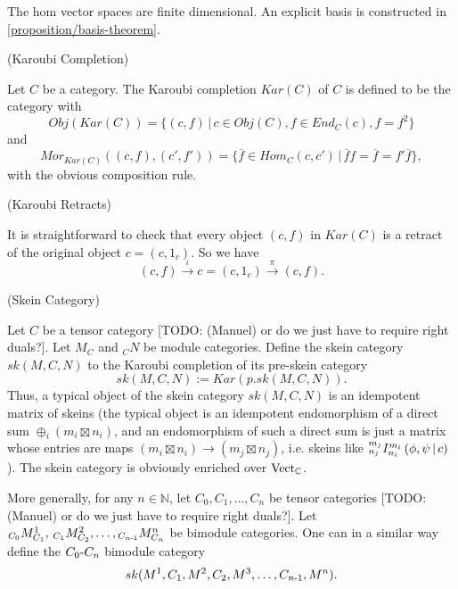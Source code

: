 \noindent The hom vector spaces are finite dimensional. An explicit basis is
constructed in \ref{proposition/basis-theorem}.

\begin{definition} \label{definition/karoubi-completion} (Karoubi Completion)

  \noindent Let $C$ be a category. \quad The Karoubi completion $Kar(C)$ of
  $C$ is defined to be the category with
  \[
    Obj(Kar(C)) = \{(c, f) \,|\, c \in Obj(C), f \in End_{C}(c), f = f^{2}\}
  \] and
  \[
    Mor_{Kar(C)}((c,f), (c', f')) = \{\overline{f} \in Hom_{C}(c,c') \,|\, \overline{f}f = \overline{f} = f'\overline{f}\},
  \]
  with the obvious composition rule.
\end{definition}

\begin{remark} \label{remark/karoubi-retract} (Karoubi Retracts)

  \noindent It is straightforward to check that every object $(c,f)$ in
  $Kar(C)$ is a retract of the original object $c = (c, 1_{c})$. So we have
  \[
    (c, f) \xrightarrow{\iota} c = (c, 1_{c}) \xrightarrow{\pi} (c, f).
  \]
\end{remark}

\begin{definition}\label{definition/skein-category} (Skein Category)

  \noindent Let $C$ be a tensor category [TODO: (Manuel) or do we just have to require right duals?]. Let $M_{C}$ and $_{C}N$ be module
  categories. \quad Define the skein category $sk(M,C,N)$ to the Karoubi
  completion of its pre-skein category
  \[
    sk(M,C,N) := Kar(p.sk(M,C,N)).
  \]
  \noindent Thus, a typical object of the skein category $sk(M,C,N)$ is an
  idempotent matrix of skeins (the typical object is an idempotent
  endomorphism of a direct sum $\oplus_{i} (m_{i} \boxtimes n_{i})$, and an
  endomorphism of such a direct sum is just a matrix whose entries are maps
  $(m_{i} \boxtimes n_{i}) \to (m_{j} \boxtimes n_{j})$, i.e. skeins like
  ${}^{m_{j}}_{n_{j}} I^{m_{i}}_{n_{i}} \left( \phi, \psi \,\middle|\, c \right)$). The skein category is
  obviously enriched over $\operatorname{Vect}_{\mathbb{C}}$.

  More generally, for any $n \in \mathbb{N}$, let
  $C_{0}, C_{1}, \ldots, C_{n}$ be tensor categories [TODO: (Manuel) or do we just have to require right duals?]. Let
  ${}_{C_{0}}M^{1}_{C_{1}}, \, {}_{C_{1}}M^{2}_{C_{2}}, \ldots, {}_{C_{n{\text -}1}}M^{n}_{C_{n}}$
  be bimodule categories. One can in a similar way define the
  $C_{0}{\text -}C_{n}$ bimodule category
  \[
    sk(M^{1}, C_{1}, M^{2}, C_{2}, M^{3}, \ldots, C_{n{\text -}1}, M^{n}).
  \]
  \begin{center}
    
  \end{center}

\end{definition}

